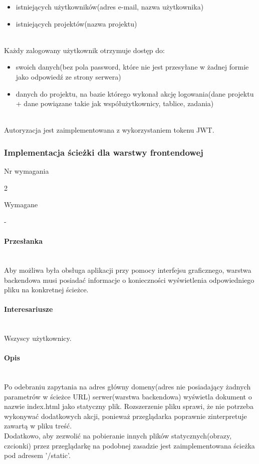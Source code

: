 \documentclass[eng,printmode]{mgr}
\begin{document}
\begin{itemize}
  \item [--] istniejących użytkowników(adres e-mail, nazwa użytkownika)
  \item[--] istniejących projektów(nazwa projektu)
\end{itemize}
\ \\
Każdy zalogowany użytkownik otrzymuje dostęp do:
\begin{itemize}
  \item[--] swoich danych(bez pola password, które nie jest przesyłane w żadnej formie jako odpowiedź ze strony serwera)
  \item[--] danych do projektu, na bazie którego wykonał akcję logowania(dane projektu + dane powiązane takie jak współużytkownicy, tablice, zadania)
\end{itemize}
\ \\
Autoryzacja jest zaimplementowana z wykorzystaniem tokenu JWT\cite{JWT}.
\newpage

\subsubsection{Implementacja ścieżki dla warstwy frontendowej}
\begin{labeling}{Nr wymagania}
\item [Nr wymagania:] 2
\item [Typ:] Wymagane
\item [Powiązania:] -
\end{labeling}

\paragraph{Przesłanka}\ \\
Aby możliwa była obsługa aplikacji przy pomocy interfejsu graficznego, warstwa backendowa musi posiadać informacje o konieczności wyświetlenia odpowiedniego pliku na konkretnej ścieżce.


\paragraph{Interesariusze}\ \\
Wszyscy użytkownicy.

\paragraph{Opis}\ \\
Po odebraniu zapytania na adres główny domeny(adres nie posiadający żadnych parametrów w ścieżce URL) serwer(warstwa backendowa) wyświetla dokument o nazwie index.html jako statyczny plik. Rozszerzenie pliku sprawi, że nie potrzeba wykonywać dodatkowych akcji, ponieważ przeglądarka poprawnie zinterpretuje zawartą w pliku treść. \\
Dodatkowo, aby zezwolić na pobieranie innych plików statycznych(obrazy, czcionki) przez przeglądarkę na podobnej zasadzie jest zaimplementowana ścieżka pod adresem '/static'.
\newpage
\end{document}
